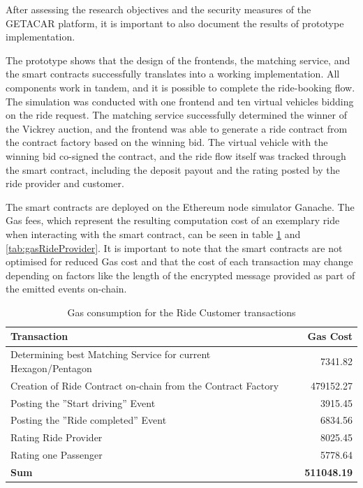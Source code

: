 After assessing  the research objectives and the security measures of the GETACAR platform, it is important to also document the results of prototype implementation. 

The prototype shows that the design of the frontends, the matching service, and the smart contracts successfully translates into a working implementation. All components work in tandem, and it is possible to complete the ride-booking flow. The simulation was conducted with one frontend and ten virtual vehicles bidding on the ride request. The matching service successfully determined the winner of the Vickrey auction, and the frontend was able to generate a ride contract from the contract factory based on the winning bid. The virtual vehicle with the winning bid co-signed the contract, and the ride flow itself was tracked through the smart contract, including the deposit payout and the rating posted by the ride provider and customer.

The smart contracts are deployed on the Ethereum node simulator Ganache. The Gas fees, which represent the resulting computation cost of an exemplary ride when interacting with the smart contract, can be seen in table \ref{tab:gasCustomer} and \ref{tab:gasRideProvider}. It is important to note that the smart contracts are not optimised for reduced Gas cost and that the cost of each transaction may change depending on factors like the length of the encrypted message provided as part of the emitted events on-chain.

\begin{table}[H]
\centering
\begin{tabular}{|l|r|}
\hline
\textbf{Transaction} & \textbf{Gas Cost} \\
\hline
Determining best Matching Service for current Hexagon/Pentagon & 7341.82 \\
\hline
Creation of Ride Contract on-chain from the Contract Factory& 479152.27 \\
\hline
Posting the ''Start driving'' Event& 3915.45 \\
\hline
Posting the ''Ride completed'' Event & 6834.56 \\
\hline
Rating Ride Provider & 8025.45 \\
\hline
Rating one Passenger & 5778.64 \\
\hline
\hline
\textbf{Sum}  & \textbf{511048.19} \\
\hline
\end{tabular}
\caption{Gas consumption for the Ride Customer transactions}
\label{tab:gasCustomer}
\end{table}

